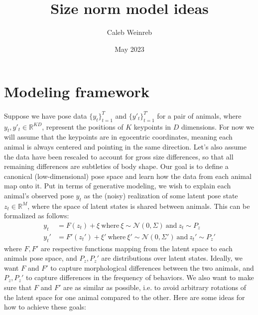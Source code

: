 \documentclass{article}         %
\title{Size norm model ideas}
\author{Caleb Weinreb}
\date{May 2023}
\begin{document}
\maketitle

\section{Modeling framework}

Suppose we have pose data $\{y_t\}_{t=1}^T$ and $\{y'_t\}_{t=1}^{T'}$ for a pair of animals, where $y_t, y'_t \in \mathbb{R}^{KD}$, represent the positions of $K$ keypoints in $D$ dimensions. For now we will assume that the keypoints are in egocentric coordinates, meaning each animal is always centered and pointing in the same direction. Let's also assume the data have been rescaled to account for gross size differences, so that all remaining differences are subtleties of body shape. Our goal is to define a canonical (low-dimensional) pose space and learn how the data from each animal map onto it. Put in terms of generative modeling, we wish to explain each animal's observed pose $y_t$ as the (noisy) realization of some latent pose state $z_t \in \mathbb{R}^M$, where the space of latent states is shared between animals. This can be formalized as follows:
%
\begin{align}
    y_t & = F(z_t) + \xi \ \text{where} \ 
    \xi \sim \mathcal{N}(0, \Sigma) \ \text{and} \ 
    z_t \sim P_z \\
    y_t' & = F'(z_t') + \xi' \ \text{where} \ 
    \xi' \sim \mathcal{N}(0, \Sigma') \ \text{and} \ 
    z_t' \sim P_z'
\end{align}
%
where $F, F'$ are respective functions mapping from the latent space to each animals pose space, and $P_z, P_z'$ are distributions over latent states. Ideally, we want $F$ and $F'$ to capture morphological differences between the two animals, and $P_z, P_z'$ to capture differences in the frequency of behaviors. We also want to make sure that $F$ and $F'$ are as similar as possible, i.e. to avoid arbitrary rotations of the latent space for one animal compared to the other. Here are some ideas for how to achieve these goals:
\end{document}
